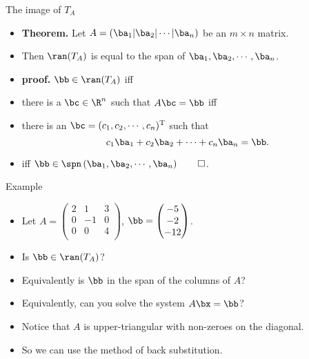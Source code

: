 \documentclass{beamer}
\begin{document}
\begin{frame}{The image of $T_A$}

\begin{itemize}
\item \textbf{Theorem.} Let $A = \left(\ba_1 \vert \ba_2 \vert \cdots \vert \ba_n \right)$
be an $m\times n$ matrix.
\item Then $\ran(T_A)$ is equal to the span of $\ba_1,\ba_2, \cdots,\ba_n$.
\item \textbf{proof.} $\bb\in\ran(T_A)$ iff
\item there is a $\bc\in\R^n$ such that $A\bc=\bb$ iff
\item there is an $\bc=(c_1, c_2,\cdots,c_n)^{\text{T}}$ such that
$$c_1\ba_1 + c_2\ba_2+\cdots+c_n\ba_n = \bb.$$
\item iff $\bb\in\spn\left( \ba_1,\ba_2, \cdots,\ba_n\right) \qed$.
\end{itemize}

\end{frame}


\begin{frame}{Example}

\begin{itemize}
\item Let
$A=
\begin{pmatrix}
2 & 1 &  3 \\
0 & -1 & 0 \\
0 & 0 &  4 \\
\end{pmatrix}
$,
$\bb=
\begin{pmatrix}
 -5 \\
 -2 \\
 -12 \\
\end{pmatrix}
$.
\item Is $\bb\in\ran(T_A)$?
\item Equivalently is $\bb$ in the span of the columns of $A$?
\item Equivalently, can you solve the system $A\bx=\bb$?
\item Notice that $A$ is upper-triangular with non-zeroes on the
diagonal.
\item So we can use the method of back substitution.
\end{itemize}

\end{frame}
\end{document}

